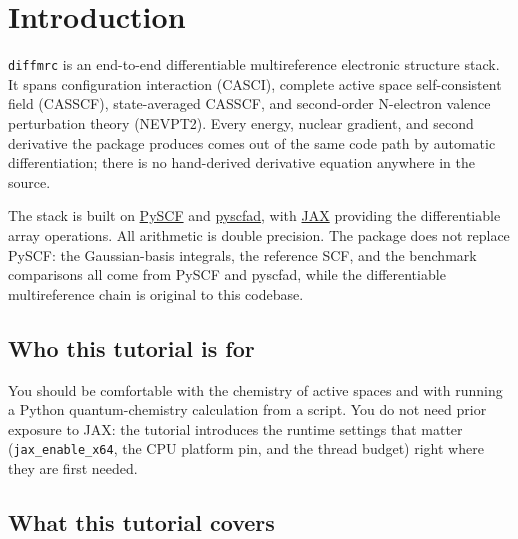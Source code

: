 \section{Introduction}
\label{sec:introduction}

\texttt{diffmrc} is an end-to-end differentiable multireference
electronic structure stack.  It spans configuration interaction
(CASCI), complete active space self-consistent field (CASSCF),
state-averaged CASSCF, and second-order N-electron valence perturbation
theory (NEVPT2).  Every energy, nuclear gradient, and second derivative
the package produces comes out of the same code path by automatic
differentiation; there is no hand-derived derivative equation anywhere
in the source.

The stack is built on \href{https://pyscf.org/}{PySCF} and
\href{https://github.com/fishjojo/pyscfad}{pyscfad}, with
\href{https://github.com/jax-ml/jax}{JAX} providing the differentiable
array operations.  All arithmetic is double precision.  The package
does not replace PySCF: the Gaussian-basis integrals, the reference
SCF, and the benchmark comparisons all come from PySCF and pyscfad,
while the differentiable multireference chain is original to this
codebase.

\subsection{Who this tutorial is for}

You should be comfortable with the chemistry of active spaces and with
running a Python quantum-chemistry calculation from a script.  You do
not need prior exposure to JAX: the tutorial introduces the runtime
settings that matter (\texttt{jax\_enable\_x64}, the CPU platform pin,
and the thread budget) right where they are first needed.

\subsection{What this tutorial covers}

